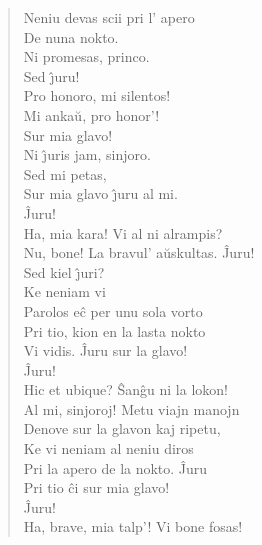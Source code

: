\begin{verse}
 Neniu devas scii pri l' apero\\
                De nuna nokto.\\
 Ni promesas, princo.\\
 Sed \^{\j}uru!\\
  Pro honoro, mi silentos!\\
 Mi anka\u u, pro honor'!\\
  Sur mia glavo!\\
 Ni \^{\j}uris jam, sinjoro.\\
  Sed mi petas,\\
                Sur mia glavo \^{\j}uru al mi.\\
 \^Juru!\\
 Ha, mia kara! Vi al ni alrampis?\\
                Nu, bone! La bravul' a\u uskultas. \^Juru!\\
 Sed kiel \^{\j}uri?\\
  Ke neniam vi\\
                Parolos e\^c per unu sola vorto\\
                Pri tio, kion en la lasta nokto\\
                Vi vidis. \^Juru sur la glavo!\\
 \^Juru!\\
 Hic et ubique? \^San\^gu ni la lokon!\\
                Al mi, sinjoroj! Metu viajn manojn\\
                Denove sur la glavon kaj ripetu,\\
                Ke vi neniam al neniu diros\\
                Pri la apero de la nokto. \^Juru\\
                Pri tio \^ci sur mia glavo!\\
 \^Juru!\\
 Ha, brave, mia talp'! Vi bone fosas!\\

\end{verse}
